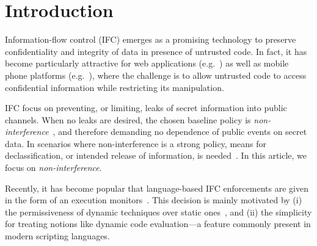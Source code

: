 \section{Introduction}
\label{sec:intro}

Information-flow control (IFC) emerges as a promising technology to preserve
confidentiality and integrity of data in presence of untrusted code.  In fact,
it has become particularly attractive for web applications
(e.g.~\citep{DeGroef:2012:FWB:2382196.2382275, giffin:hails, yang:2013:towards,
  conf/esorics/AkhaweLHSS13, Hedin13}) as well as mobile phone platforms
(e.g.~\citep{Enck:2010,android:esorics13}), where the challenge is to allow
untrusted code to access confidential information while restricting its
manipulation.

IFC focus on preventing, or limiting, leaks of secret information into public
channels. When no leaks are desired, the chosen baseline policy is
\emph{non-interference}~\citep{Goguen:Meseguer:Noninterference}, and therefore
demanding no dependence of public events on secret data. In scenarios where
non-interference is a strong policy, means for declassification, or intended
release of information, is needed~\citep{Sabelfeld:Sands:CSFW05}. In this
article, we focus on \emph{non-interference}. 

Recently, it has become popular that language-based IFC enforcements are given
in the form of an execution monitors~\citep{Hedin2011}. This decision is mainly
motivated by (i) the permissiveness of dynamic techniques over static
ones~\citep{Sabelfeld:Russo:PSI09}, and (ii) the simplicity for treating notions
like dynamic code evaluation---a feature commonly present in modern scripting
languages.









